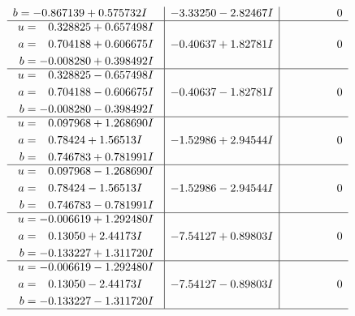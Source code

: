 \documentclass[1p]{elsarticle_modified}
\theoremstyle{definition}
\begin{document}
$$\begin{array}{c|c|c}
\begin{aligned}
b &= -0.867139 + 0.575732 I\end{aligned}
 & -3.33250 - 2.82467 I & \phantom{-0.000000 } 0 \\ \hline\begin{aligned}
u &= \phantom{-}0.328825 + 0.657498 I \\
a &= \phantom{-}0.704188 + 0.606675 I \\
b &= -0.008280 + 0.398492 I\end{aligned}
 & -0.40637 + 1.82781 I & \phantom{-0.000000 } 0 \\ \hline\begin{aligned}
u &= \phantom{-}0.328825 - 0.657498 I \\
a &= \phantom{-}0.704188 - 0.606675 I \\
b &= -0.008280 - 0.398492 I\end{aligned}
 & -0.40637 - 1.82781 I & \phantom{-0.000000 } 0 \\ \hline\begin{aligned}
u &= \phantom{-}0.097968 + 1.268690 I \\
a &= \phantom{-}0.78424 + 1.56513 I \\
b &= \phantom{-}0.746783 + 0.781991 I\end{aligned}
 & -1.52986 + 2.94544 I & \phantom{-0.000000 } 0 \\ \hline\begin{aligned}
u &= \phantom{-}0.097968 - 1.268690 I \\
a &= \phantom{-}0.78424 - 1.56513 I \\
b &= \phantom{-}0.746783 - 0.781991 I\end{aligned}
 & -1.52986 - 2.94544 I & \phantom{-0.000000 } 0 \\ \hline\begin{aligned}
u &= -0.006619 + 1.292480 I \\
a &= \phantom{-}0.13050 + 2.44173 I \\
b &= -0.133227 + 1.311720 I\end{aligned}
 & -7.54127 + 0.89803 I & \phantom{-0.000000 } 0 \\ \hline\begin{aligned}
u &= -0.006619 - 1.292480 I \\
a &= \phantom{-}0.13050 - 2.44173 I \\
b &= -0.133227 - 1.311720 I\end{aligned}
 & -7.54127 - 0.89803 I & \phantom{-0.000000 } 0\\
 \hline 
 \end{array}$$\newpage$$\begin{array}{c|c|c}  

\end{array}$$
\end{document}
